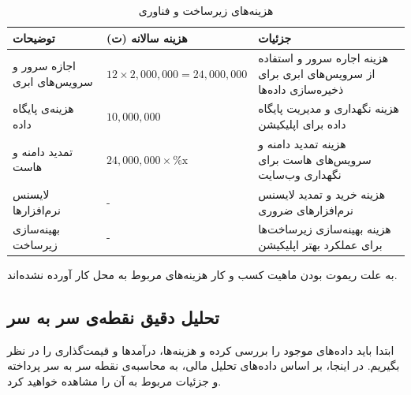 \documentclass[dvipsnames, svgnames, x11names, 11pt]{article}
\begin{document}
\begin{table}[H]
\begin{center}
\caption{هزینه‌های زیرساخت و فناوری}
\begin{tabular}{p{}|p{}|p{
}}
توضیحات &
هزینه سالانه (ت) &
جزئیات \\
\hline
\hline

اجازه سرور و سرویس‌های ابری
&
\raggedright
$12 \times 2,000,000 = 24,000,000$
&
هزینه اجاره سرور و استفاده از سرویس‌های ابری برای ذخیره‌سازی داده‌ها
\\ \hline

هزینه‌ی پایگاه داده
&
\raggedright
$10,000,000$
&
هزینه نگهداری و مدیریت پایگاه داده برای اپلیکیشن
\\ \hline

تمدید دامنه و هاست
&
\raggedright
$24,000,000 \times \text{\%x}$
&
هزینه تمدید دامنه و سرویس‌های هاست برای نگهداری وب‌سایت
\\ \hline

لایسنس نرم‌افزارها
&
\centering
-
&
هزینه خرید و تمدید لایسنس نرم‌افزارهای ضروری
\\ \hline

بهینه‌سازی زیرساخت
&
\centering
-
&
هزینه بهینه‌سازی زیرساخت‌ها برای عملکرد بهتر اپلیکیشن
\\ \hline
\end{tabular}
\end{center}
\end{table}

به علت ریموت بودن ماهیت کسب و کار هزینه‌های مربوط به محل کار آورده نشده‌اند.
\subsection{تحلیل دقیق نقطه‌‌ی سر به سر}
 ابتدا باید داده‌های موجود را بررسی کرده و هزینه‌ها، درآمدها و قیمت‌گذاری را در نظر بگیریم. در اینجا، بر اساس داده‌های تحلیل مالی، به محاسبه‌ی نقطه سر به سر پرداخته و جزئیات مربوط به آن را مشاهده خواهید کرد.
\end{document}
